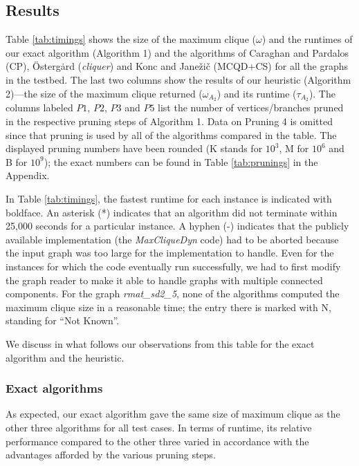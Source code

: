

\subsection{Results}
\label{sec:exp-results}



Table \ref{tab:timings} shows the size of the maximum clique ($\omega$) and the runtimes  of our exact algorithm (Algorithm 1) and the algorithms of Caraghan and Pardalos (CP), 
\"{O}sterg\.{a}rd ({\it cliquer}) 
and Konc and Jane\v{z}i\v{c}  (MCQD+CS) for all the graphs in the testbed. 
The last two columns show the results of our heuristic (Algorithm 2)---the size of the maximum clique 
returned ($\omega_{A_2}$)  and its runtime ($\tau_{A_2}$). 
The columns labeled $P1$, $P2$, $P3$ and $P5$ list the number of 
vertices/branches pruned in the respective pruning steps of Algorithm 1.
Data on Pruning 4 is omitted since that pruning is used by all of the algorithms compared in the table. The displayed pruning numbers have been rounded  (K stands for $10^3$, M for $10^6$ and B for $10^9$);
the exact numbers can be found in Table \ref{tab:prunings} in the Appendix.

In Table \ref{tab:timings}, the fastest runtime for each instance is indicated with boldface. 
An asterisk (*) indicates that an algorithm did not terminate within 25,000 seconds for a particular
instance. A hyphen (-) indicates that the publicly available implementation 
(the {\it MaxCliqueDyn} code) had to be aborted because the input graph was too large 
for the implementation to handle. Even for the instances for which the code
eventually run successfully, we had to first modify 
the graph reader to make it able to handle graphs with multiple connected components.
For the graph {\it rmat\_sd2\_5}, none of the algorithms computed the maximum clique size in 
a reasonable time; the entry there is marked with N, standing for  ``Not Known''.

We discuss in what follows our observations from this table
for the exact algorithm and the heuristic.

\subsubsection{Exact algorithms}
\label{sec:exp-exact}

As expected, our exact algorithm gave the same size of maximum clique as the other
three algorithms for all test cases. 
In terms of runtime,  its relative performance compared to the other three varied
in accordance with the advantages afforded by the various pruning steps.  




